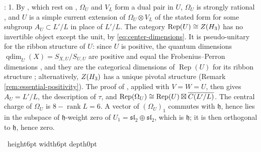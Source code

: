 \documentclass[leqno]{article}
\let\cal\relax
\newcommand{\cal}{\mathcal}
\newcommand{\qed}{\hfill \vrule height6pt  width6pt depth0pt}
\newcommand{\ot}{\otimes}
\DeclareMathOperator{\Rep}{Rep}
\newenvironment{proof}[1][]{\noindent {\it Proof #1} : }{\hbox{~}\qed
\smallskip
}
\numberwithin{equation}{section}
\begin{document}
\begin{proof}
1. By \cite[Definition 2.12, Proposition 2.14]{MoR24a}, which rest on \cite{Mas14}, $\Omega_U$ and $V_L$ form a dual pair in $U$, $\Omega_U$ is strongly rational \cite{CKLR19}, and $U$ is a simple current extension of $\Omega_U \ot V_L$ of the stated form for some subgroup $A_U \subset L'/L$ in place of $L'/L$. The category $\Rep(U) \cong Z(\cal H_3)$ has no invertible object except the unit, by \eqref{eq:center-dimensions}. It is pseudo-unitary for the ribbon structure of $U$: since $U$ is positive, the quantum dimensions $\operatorname{qdim}_U(X) = S_{X,U}/S_{U,U}$ are positive and equal the Frobenius--Perron dimensions \cite{DJX13}, and they are the categorical dimensions of $\Rep(U)$ for its ribbon structure \cite{Hua08}; alternatively, $Z(\cal H_3)$ has a unique pivotal structure (Remark \ref{rem:essential-positivity}). The proof of \cite[Corollary 4.10]{MoR24a}, applied with $V = W = U$, then gives $A_U = L'/L$, the description of $\tau$, and $\Rep(\Omega_U) \cong \Rep(U) \boxtimes \overline{\cal C(L'/L)}$. The central charge of $\Omega_U$ is $8-\operatorname{rank}L = 6$. A vector of $(\Omega_U)_1$ commutes with $\mathfrak h$, hence lies in the subspace of $\mathfrak h$-weight zero of $U_1 = \mathfrak{sl}_2 \oplus \mathfrak{sl}_2$, which is $\mathfrak h$; it is then orthogonal to $\mathfrak h$, hence zero.


\end{proof}
\end{document}
